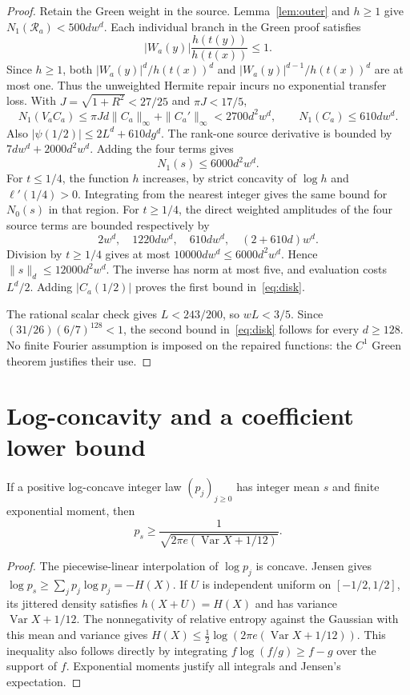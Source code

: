 \documentclass[11pt,a4paper]{article}
\theoremstyle{remark}\newtheorem*{ednote}{Editorial note (ProveIt, 2026-10-01)}
\begin{document}
\begin{proof}
Retain the Green weight in the source. Lemma~\ref{lem:outer} and $h\ge1$ give
$N_1(\mathcal R_a)<500d w^d$. Each individual branch in the Green proof satisfies
\[
 |W_a(y)|\frac{h(t(y))}{h(t(x))}\le1.
\]
Since $h\ge1$, both $|W_a(y)|^d/h(t(x))^d$ and
$|W_a(y)|^{d-1}/h(t(x))^d$ are at most one. Thus the unweighted Hermite repair incurs no exponential transfer loss. With $J=\sqrt{1+R^2}<27/25$ and $\pi J<17/5$,
\[
 N_1(V_aC_a)\le\pi Jd\|C_a\|_\infty+\|C_a'\|_\infty
 <2700d^2w^d,\qquad N_1(C_a)\le610d w^d.
\]
Also $|\psi(1/2)|\le2L^d+610d g^d$. The rank-one source derivative is bounded by
$7d w^d+2000d^2w^d$. Adding the four terms gives
\[
 N_1(s)\le6000d^2w^d.
\]
For $t\le1/4$, the function $h$ increases, by strict concavity of $\log h$ and $\ell'(1/4)>0$. Integrating from the nearest integer gives the same bound for $N_0(s)$ in that region. For $t\ge1/4$, the direct weighted amplitudes of the four source terms are bounded respectively by
\[
 2w^d,\quad1220d w^d,\quad610d w^d,\quad(2+610d)w^d.
\]
Division by $t\ge1/4$ gives at most $10000d w^d\le6000d^2w^d$. Hence
$\|s\|_d\le12000d^2w^d$. The inverse has norm at most five, and evaluation costs $L^d/2$. Adding $|C_a(1/2)|$ proves the first bound in~\eqref{eq:disk}.

The rational scalar check gives $L<243/200$, so $wL<3/5$. Since
$(31/26)(6/7)^{128}<1$, the second bound in~\eqref{eq:disk} follows for every $d\ge128$. No finite Fourier assumption is imposed on the repaired functions: the $C^1$ Green theorem justifies their use.
\end{proof}

\section{Log-concavity and a coefficient lower bound}
\begin{lemma}\label{lem:entropy}
If a positive log-concave integer law $(p_j)_{j\ge0}$ has integer mean $s$ and finite exponential moment, then
\[
 p_s\ge\frac1{\sqrt{2\pi e(\operatorname{Var}X+1/12)}}.
\]
\end{lemma}
\begin{proof}
The piecewise-linear interpolation of $\log p_j$ is concave. Jensen gives $\log p_s\ge\sum_jp_j\log p_j=-H(X)$. If $U$ is independent uniform on $[-1/2,1/2]$, its jittered density satisfies $h(X+U)=H(X)$ and has variance $\operatorname{Var}X+1/12$. The nonnegativity of relative entropy against the Gaussian with this mean and variance gives
$H(X)\le\frac12\log(2\pi e(\operatorname{Var}X+1/12))$. This inequality also follows directly by integrating $f\log(f/g)\ge f-g$ over the support of $f$. Exponential moments justify all integrals and Jensen's expectation.
\end{proof}
\end{document}
